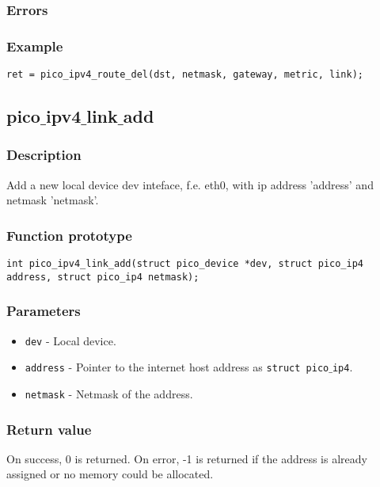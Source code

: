 \subsubsection*{Errors}

\subsubsection*{Example}
\begin{verbatim}
ret = pico_ipv4_route_del(dst, netmask, gateway, metric, link);
\end{verbatim}



\subsection{pico$\_$ipv4$\_$link$\_$add }

\subsubsection*{Description}
Add a new local device dev inteface, f.e. eth0, with ip address 'address' and netmask 'netmask'.

\subsubsection*{Function prototype}
\begin{verbatim}
int pico_ipv4_link_add(struct pico_device *dev, struct pico_ip4 address, struct pico_ip4 netmask);
\end{verbatim}

\subsubsection*{Parameters}
\begin{itemize}[noitemsep]
\item \texttt{dev} - Local device.
\item \texttt{address} - Pointer to the internet host address as \texttt{struct pico$\_$ip4}.
\item \texttt{netmask} - Netmask of the address.
\end{itemize}

\subsubsection*{Return value}
On success, 0 is returned. On error, -1 is returned if the address is already assigned or no memory could be allocated.


